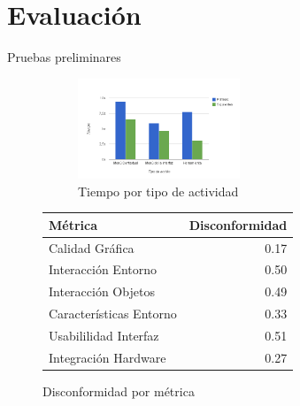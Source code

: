 \section{Evaluación}

\begin{frame}{Pruebas preliminares}

\begin{figure}
    \begin{subfigure}[b]{.5\linewidth}
        \centering
        \includegraphics[height=3cm]{../resultados/imagenes/interfaz_tiempo_actividades.png}
        \caption{Tiempo por tipo de actividad}
    \end{subfigure}\hfill
    \pause
    \begin{subtable}[b]{.5\linewidth}
        \tiny
        \centering
        \begin{tabular}{lr}
        \toprule
        Métrica & Disconformidad \\
        \midrule
        Calidad Gráfica         & {\color{green!90!black} 0.17} \\
        Interacción Entorno     & {\color{red!90}   0.50} \\
        Interacción Objetos     & {\color{red!90}   0.49} \\
        Características Entorno & {\color{green!90!black} 0.33} \\
        Usabililidad Interfaz   & {\color{red!90}   0.51} \\
        Integración Hardware    & {\color{green!90!black} 0.27} \\
        \bottomrule
        \end{tabular}
        \caption{Disconformidad por métrica}
    \end{subtable}
\end{figure}

\end{frame}

